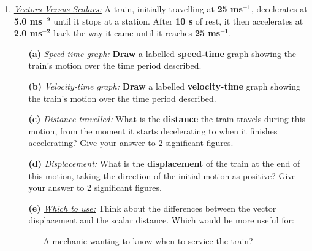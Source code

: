\documentclass[A4,12pt]{article}
\begin{document}
\begin{enumerate}[label=\bfseries (\arabic*)]
\begin{itemize}
\end{itemize}
%
%
%
%
%
%
%
%
%
%
%
%
%
%
%
%
%
%
%
%
%
%
%
%
%
%
%
%
%
%
%
%
%
%
%
%
%
%
%
%
%
%
%
%
%
%
%
%
%
%
%
\item \href{https://isaacphysics.org/questions/vector_scalar_train?board=72ae6868-9544-47c3-a068-786d3fc0ddd5}{\it Vectors Versus Scalars:} A train, initially travelling at {\bf 25 ms}$\bm{^{-1}}$, decelerates at {\bf 5.0 ms}$\bm{^{-2}}$ until it stops at a station. After {\bf 10 s} of rest, it then accelerates at {\bf 2.0 ms}$\bm{^{-2}}$ back the way it came until it reaches {\bf 25 ms}$\bm{^{-1}}$.
    \begin{itemize}
        \item[\bf (a)] {\it Speed-time graph:} {\bf Draw} a labelled {\bf speed-time} graph showing the train's motion over the time period described.
        \item[\bf (b)] {\it Velocity-time graph:} {\bf Draw} a labelled {\bf velocity-time} graph showing the train's motion over the time period described.
        \item[\bf (c)] \href{https://www.youtube.com/watch?time_continue=4&v=ANMPJVuXtMI}{\it Distance travelled:} What is the {\bf distance} the train travels during this motion, from the moment it starts decelerating to when it finishes accelerating? Give your answer to 2 significant figures.
        \item[\bf (d)] \href{https://www.youtube.com/watch?v=C_VGuW6Rgpk}{\it Displacement:} What is the {\bf displacement} of the train at the end of this motion, taking the direction of the initial motion as positive? Give your answer to 2 significant figures.
        \item[\bf (e)] \href{https://www.youtube.com/watch?v=C_VGuW6Rgpk}{\it Which to use:} Think about the differences between the vector displacement and the scalar distance. Which would be more useful for:
        \begin{itemize}
            \item[\textbullet] A mechanic wanting to know when to service the train?

\end{itemize}
\end{itemize}
\end{enumerate}
\end{document}
